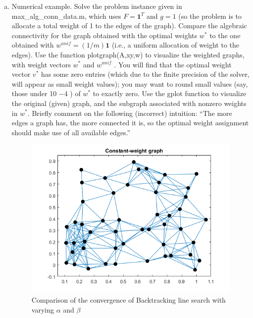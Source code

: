 \begin{enumerate}[(a)]
\item{Numerical example. Solve the problem instance given in max\_alg\_conn\_data.m, which uses
$F = \mathbf{1}^{T}$ and $g = 1$ (so the problem is to allocate a total weight of 1 to the edges of the graph).
Compare the algebraic connectivity for the graph obtained with the optimal weights $w^{*}$ to the
one obtained with $w^{unif} = (1/m)\mathbf{1}$ (i.e., a uniform allocation of weight to the edges).
Use the function plotgraph(A,xy,w) to visualize the weighted graphs, with weight vectors
$w^{*}$ and $w^{unif}$ . You will find that the optimal weight vector $v^{*}$ has some zero entries (which
due to the finite precision of the solver, will appear as small weight values); you may want to
round small values (say, those under 10 −4 ) of $w^{*}$ to exactly zero. Use the gplot function to
visualize the original (given) graph, and the subgraph associated with nonzero weights in $w^{*}$.
Briefly comment on the following (incorrect) intuition: “The more edges a graph has, the more
connected it is, so the optimal weight assignment should make use of all available edges.”
\begin{figure}[h!]
  \centering
\includegraphics[width=\textwidth]{source/part2/fig1}
\caption{Comparison of the convergence of Backtracking line search with varying $\alpha$ and $\beta$}
\end{figure}
\begin{figure}[h!]
  \centering

\end{figure}}
\end{enumerate}
